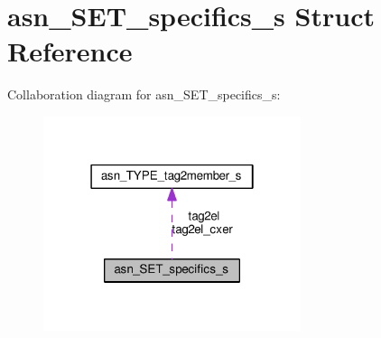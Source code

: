 \hypertarget{structasn__SET__specifics__s}{}\section{asn\+\_\+\+S\+E\+T\+\_\+specifics\+\_\+s Struct Reference}
\label{structasn__SET__specifics__s}


Collaboration diagram for asn\+\_\+\+S\+E\+T\+\_\+specifics\+\_\+s\+:\nopagebreak
\begin{figure}[H]
\begin{center}
\leavevmode
\includegraphics[width=214pt]{structasn__SET__specifics__s__coll__graph}
\end{center}
\end{figure}
